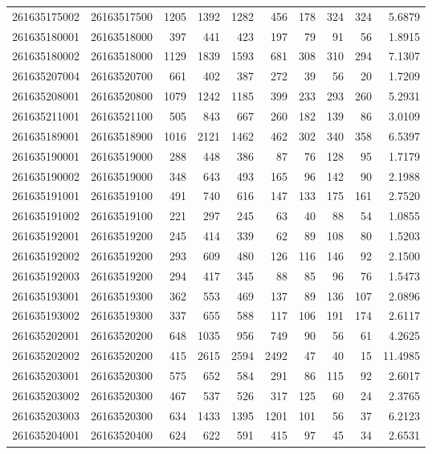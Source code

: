 \documentclass[
  11pt,
]{article}
\begin{document}
\begin{longtable}[t]{llrrrrrrrr}
261635175002 & 26163517500 & 1205 & 1392 & 1282 & 456 & 178 & 324 & 324 & 5.6879\\
261635180001 & 26163518000 & 397 & 441 & 423 & 197 & 79 & 91 & 56 & 1.8915\\
261635180002 & 26163518000 & 1129 & 1839 & 1593 & 681 & 308 & 310 & 294 & 7.1307\\
261635207004 & 26163520700 & 661 & 402 & 387 & 272 & 39 & 56 & 20 & 1.7209\\
261635208001 & 26163520800 & 1079 & 1242 & 1185 & 399 & 233 & 293 & 260 & 5.2931\\
261635211001 & 26163521100 & 505 & 843 & 667 & 260 & 182 & 139 & 86 & 3.0109\\
261635189001 & 26163518900 & 1016 & 2121 & 1462 & 462 & 302 & 340 & 358 & 6.5397\\
261635190001 & 26163519000 & 288 & 448 & 386 & 87 & 76 & 128 & 95 & 1.7179\\
261635190002 & 26163519000 & 348 & 643 & 493 & 165 & 96 & 142 & 90 & 2.1988\\
261635191001 & 26163519100 & 491 & 740 & 616 & 147 & 133 & 175 & 161 & 2.7520\\
261635191002 & 26163519100 & 221 & 297 & 245 & 63 & 40 & 88 & 54 & 1.0855\\
261635192001 & 26163519200 & 245 & 414 & 339 & 62 & 89 & 108 & 80 & 1.5203\\
261635192002 & 26163519200 & 293 & 609 & 480 & 126 & 116 & 146 & 92 & 2.1500\\
261635192003 & 26163519200 & 294 & 417 & 345 & 88 & 85 & 96 & 76 & 1.5473\\
261635193001 & 26163519300 & 362 & 553 & 469 & 137 & 89 & 136 & 107 & 2.0896\\
261635193002 & 26163519300 & 337 & 655 & 588 & 117 & 106 & 191 & 174 & 2.6117\\
261635202001 & 26163520200 & 648 & 1035 & 956 & 749 & 90 & 56 & 61 & 4.2625\\
261635202002 & 26163520200 & 415 & 2615 & 2594 & 2492 & 47 & 40 & 15 & 11.4985\\
261635203001 & 26163520300 & 575 & 652 & 584 & 291 & 86 & 115 & 92 & 2.6017\\
261635203002 & 26163520300 & 467 & 537 & 526 & 317 & 125 & 60 & 24 & 2.3765\\
261635203003 & 26163520300 & 634 & 1433 & 1395 & 1201 & 101 & 56 & 37 & 6.2123\\
261635204001 & 26163520400 & 624 & 622 & 591 & 415 & 97 & 45 & 34 & 2.6531\\

\end{longtable}
\end{document}
